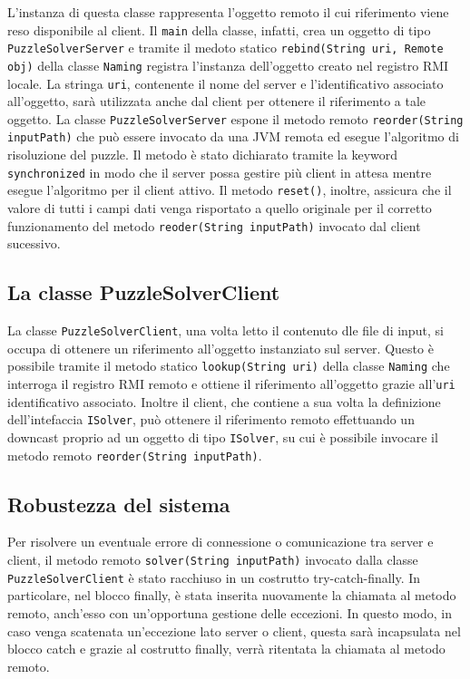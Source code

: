 L'instanza di questa classe rappresenta l'oggetto remoto il cui riferimento viene reso disponibile al client.
Il \texttt{main} della classe, infatti, crea un oggetto di tipo \texttt{PuzzleSolverServer} e tramite il medoto statico
\texttt{rebind(String uri, Remote obj)} della classe \texttt{Naming} registra l'instanza dell'oggetto creato nel
registro RMI locale. La stringa \texttt{uri}, contenente il nome del server e l'identificativo associato all'oggetto, sarà
utilizzata anche dal client per ottenere il riferimento a tale oggetto.
La classe \texttt{PuzzleSolverServer} espone il metodo remoto \texttt{reorder(String inputPath)} che può essere invocato
da una JVM remota ed esegue l'algoritmo di risoluzione del puzzle. Il metodo è stato dichiarato tramite la keyword
\texttt{synchronized} in modo che il server possa gestire più client in attesa mentre esegue l'algoritmo per il client attivo.
Il metodo \texttt{reset()}, inoltre, assicura che il valore di tutti i campi dati venga risportato a quello originale per
il corretto funzionamento del metodo \texttt{reoder(String inputPath)} invocato dal client sucessivo.


\subsection{La classe PuzzleSolverClient}

La classe \texttt{PuzzleSolverClient}, una volta letto il contenuto dle file di input, si occupa di ottenere un riferimento
all'oggetto instanziato sul server. Questo è possibile tramite il metodo statico \texttt{lookup(String uri)} della classe
\texttt{Naming} che interroga il registro RMI remoto e ottiene il riferimento all'oggetto grazie all'\texttt{uri} identificativo
associato. Inoltre il client, che contiene a sua volta la definizione dell'intefaccia \texttt{ISolver}, può ottenere il
riferimento remoto effettuando un downcast proprio ad un oggetto di tipo \texttt{ISolver}, su cui è possibile invocare il metodo
remoto \texttt{reorder(String inputPath)}.


\subsection{Robustezza del sistema}

Per risolvere un eventuale errore di connessione o comunicazione tra server e client, il metodo remoto \texttt{solver(String inputPath)}
invocato dalla classe \texttt{PuzzleSolverClient} è stato racchiuso in un costrutto try-catch-finally.
In particolare, nel blocco finally, è stata inserita nuovamente la chiamata al metodo remoto, anch'esso con un'opportuna gestione
delle eccezioni. In questo modo, in caso venga scatenata un'eccezione lato server o client, questa sarà incapsulata nel blocco
catch e grazie al costrutto finally, verrà ritentata la chiamata al metodo remoto.
